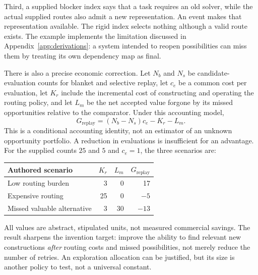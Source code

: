 \documentclass[11pt,letterpaper]{article}
\theoremstyle{remark}\newtheorem{remark}{Remark}[section]
\begin{document}
Third, a supplied blocker index says that a task requires an old solver, while the actual supplied routes also admit a new representation. An event makes that representation available. The rigid index selects nothing although a valid route exists. The example implements the limitation discussed in Appendix~\ref{app:derivations}: a system intended to reopen possibilities can miss them by treating its own dependency map as final.

There is also a precise economic correction. Let $N_b$ and $N_s$ be candidate-evaluation counts for blanket and selective replay, let $c_e$ be a common cost per evaluation, let $K_r$ include the incremental cost of constructing and operating the routing policy, and let $L_m$ be the net accepted value forgone by its missed opportunities relative to the comparator. Under this accounting model,
\begin{equation}
G_{\mathrm{replay}}=(N_b-N_s)c_e-K_r-L_m.
\label{eq:replay-net}
\end{equation}
This is a conditional accounting identity, not an estimator of an unknown opportunity portfolio. A reduction in evaluations is insufficient for an advantage. For the supplied counts $25$ and $5$ and $c_e=1$, the three scenarios are:
\begin{center}
\small
\begin{tabular}{lrrr}
\toprule
\textbf{Authored scenario}&$K_r$&$L_m$&$G_{\mathrm{replay}}$\\\midrule
Low routing burden&3&0&17\\
Expensive routing&25&0&$-5$\\
Missed valuable alternative&3&30&$-13$\\\bottomrule
\end{tabular}
\end{center}
All values are abstract, stipulated units, not measured commercial savings. The result sharpens the invention target: improve the ability to find relevant new constructions \emph{after} routing costs and missed possibilities, not merely reduce the number of retries. An exploration allocation can be justified, but its size is another policy to test, not a universal constant.
\end{document}
